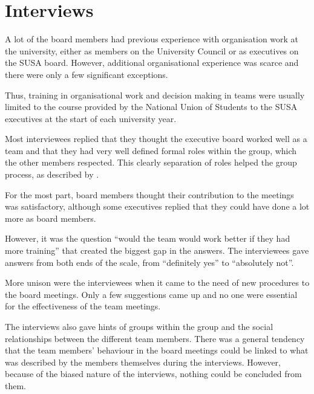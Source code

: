 \documentclass[a4paper,12pt,titlepage]{report}
\begin{document}
  \newpage
  \section{Interviews}
  A lot of the board members had previous experience with organisation work
  at the university, either as members on the University Council or as executives
  on the SUSA board. However, additional organisational experience was scarce and
  there were only a few significant exceptions.

  Thus, training in organisational work and decision making in teams were
  usually limited to the course provided by the National Union of Students
  to the SUSA executives at the start of each university year.

  Most interviewees replied that they thought the executive board worked well as
  a team and that they had very well defined formal roles within the group, which
  the other members respected. This clearly separation of roles helped the
  group process, as described by \citet{rb}.

  For the most part, board members thought their contribution
  to the meetings was satisfactory, although some executives replied
  that they could have done a lot more as board members.

  However, it was the question ``would the team would work better if they had more
  training'' that created the biggest gap in the answers. The interviewees
  gave answers from both ends of the scale, from ``definitely yes''
  to ``absolutely not''.

  More unison were the interviewees when it came to the need of new procedures
  to the board meetings. Only a few suggestions came up and no one were essential
  for the effectiveness of the team meetings.


  The interviews also gave hints of groups within the group and the social
  relationships between the different team members.
  There was a general tendency that the team members' behaviour in
  the board meetings could be linked to what was described by
  the members themselves during the interviews. However, because of
  the biased nature of the interviews, nothing could be concluded from them.
\end{document}

